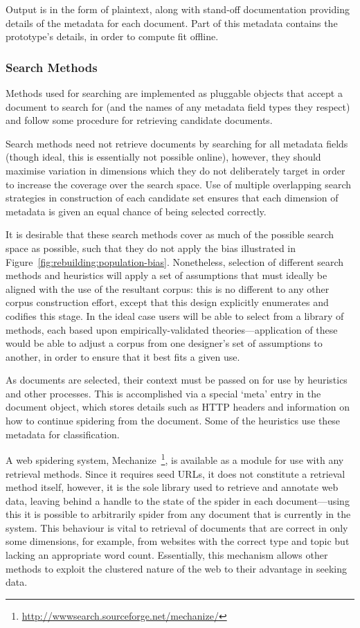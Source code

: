 Output is in the form of plaintext, along with stand-off documentation providing details of the metadata for each document.  Part of this metadata contains the prototype's details, in order to compute fit offline.



\subsubsection{Search Methods}
Methods used for searching are implemented as pluggable objects that accept a document to search for (and the names of any metadata field types they respect) and follow some procedure for retrieving candidate documents.

Search methods need not retrieve documents by searching for all metadata fields (though ideal, this is essentially not possible online), however, they should maximise variation in dimensions which they do not deliberately target in order to increase the coverage over the search space.  Use of multiple overlapping search strategies in construction of each candidate set ensures that each dimension of metadata is given an equal chance of being selected correctly.

It is desirable that these search methods cover as much of the possible search space as possible, such that they do not apply the bias illustrated in Figure~\ref{fig:rebuilding:population-bias}.  Nonetheless, selection of different search methods and heuristics will apply a set of assumptions that must ideally be aligned with the use of the resultant corpus: this is no different to any other corpus construction effort, except that this design explicitly enumerates and codifies this stage.  In the ideal case users will be able to select from a library of methods, each based upon empirically-validated theories---application of these would be able to adjust a corpus from one designer's set of assumptions to another, in order to ensure that it best fits a given use.

As documents are selected, their context must be passed on for use by heuristics and other processes.  This is accomplished via a special `meta' entry in the document object, which stores details such as HTTP headers and information on how to continue spidering from the document.  Some of the heuristics use these metadata for classification.

A web spidering system, Mechanize~\footnote{\url{http://wwwsearch.sourceforge.net/mechanize/}}, is available as a module for use with any retrieval methods.  Since it requires seed URLs, it does not constitute a retrieval method itself, however, it is the sole library used to retrieve and annotate web data, leaving behind a handle to the state of the spider in each document---using this it is possible to arbitrarily spider from any document that is currently in the system.  This behaviour is vital to retrieval of documents that are correct in only some dimensions, for example, from websites with the correct type and topic but lacking an appropriate word count.  Essentially, this mechanism allows other methods to exploit the clustered nature of the web to their advantage in seeking data.


